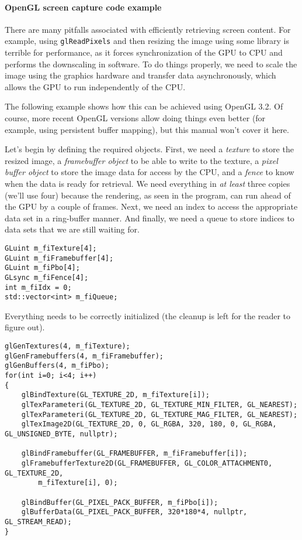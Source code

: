 \documentclass[hidelinks,titlepage,a4paper,twoside]{article}
\begin{document}
\paragraph{OpenGL screen capture code example}
\label{screenshotcode}

There are many pitfalls associated with efficiently retrieving screen content. For example, using \texttt{glReadPixels} and then resizing the image using some library is terrible for performance, as it forces synchronization of the GPU to CPU and performs the downscaling in software. To do things properly, we need to scale the image using the graphics hardware and transfer data asynchronously, which allows the GPU to run independently of the CPU.

The following example shows how this can be achieved using OpenGL 3.2. Of course, more recent OpenGL versions allow doing things even better (for example, using persistent buffer mapping), but this manual won't cover it here.

Let's begin by defining the required objects. First, we need a \emph{texture} to store the resized image, a \emph{framebuffer object} to be able to write to the texture, a \emph{pixel buffer object} to store the image data for access by the CPU, and a \emph{fence} to know when the data is ready for retrieval. We need everything in \emph{at least} three copies (we'll use four) because the rendering, as seen in the program, can run ahead of the GPU by a couple of frames. Next, we need an index to access the appropriate data set in a ring-buffer manner. And finally, we need a queue to store indices to data sets that we are still waiting for.

\begin{lstlisting}
GLuint m_fiTexture[4];
GLuint m_fiFramebuffer[4];
GLuint m_fiPbo[4];
GLsync m_fiFence[4];
int m_fiIdx = 0;
std::vector<int> m_fiQueue;
\end{lstlisting}

Everything needs to be correctly initialized (the cleanup is left for the reader to figure out).

\begin{lstlisting}
glGenTextures(4, m_fiTexture);
glGenFramebuffers(4, m_fiFramebuffer);
glGenBuffers(4, m_fiPbo);
for(int i=0; i<4; i++)
{
    glBindTexture(GL_TEXTURE_2D, m_fiTexture[i]);
    glTexParameteri(GL_TEXTURE_2D, GL_TEXTURE_MIN_FILTER, GL_NEAREST);
    glTexParameteri(GL_TEXTURE_2D, GL_TEXTURE_MAG_FILTER, GL_NEAREST);
    glTexImage2D(GL_TEXTURE_2D, 0, GL_RGBA, 320, 180, 0, GL_RGBA, GL_UNSIGNED_BYTE, nullptr);

    glBindFramebuffer(GL_FRAMEBUFFER, m_fiFramebuffer[i]);
    glFramebufferTexture2D(GL_FRAMEBUFFER, GL_COLOR_ATTACHMENT0, GL_TEXTURE_2D,
		m_fiTexture[i], 0);

    glBindBuffer(GL_PIXEL_PACK_BUFFER, m_fiPbo[i]);
    glBufferData(GL_PIXEL_PACK_BUFFER, 320*180*4, nullptr, GL_STREAM_READ);
}
\end{lstlisting}
\end{document}
